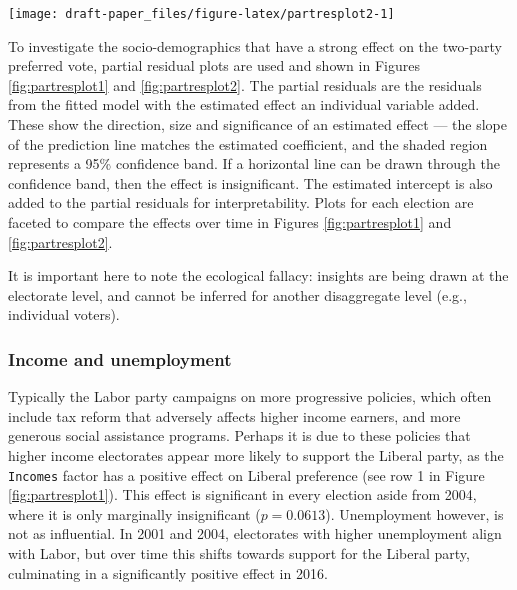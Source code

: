 \documentclass[11pt,a4paper,]{article}
\let\origfigure\figure
\let\endorigfigure\endfigure
\renewenvironment{figure}[1][2] {
    \expandafter\origfigure\expandafter[htbp]
} {
    \endorigfigure
}
\begin{document}
\begin{figure}[h]

{\centering \texttt{[image: draft-paper\_files/figure-latex/partresplot2-1]} 

}

\caption{Partial residual plots by election year for a selection of predictors. Linear model with 95\% confidence bands is overlaid. Several predictors have a negative relationship: with larger values indicating the electorate more likely preferences Labor. Education exhibits a strong temporal change.}\label{fig:partresplot2}
\end{figure}

To investigate the socio-demographics that have a strong effect on the two-party preferred vote, partial residual plots are used and shown in Figures \ref{fig:partresplot1} and \ref{fig:partresplot2}. The partial residuals are the residuals from the fitted model with the estimated effect an individual variable added. These show the direction, size and significance of an estimated effect --- the slope of the prediction line matches the estimated coefficient, and the shaded region represents a 95\% confidence band. If a horizontal line can be drawn through the confidence band, then the effect is insignificant. The estimated intercept is also added to the partial residuals for interpretability. Plots for each election are faceted to compare the effects over time in Figures \ref{fig:partresplot1} and \ref{fig:partresplot2}.

It is important here to note the ecological fallacy: insights are being drawn at the electorate level, and cannot be inferred for another disaggregate level (e.g., individual voters).

\hypertarget{income-and-unemployment}{%
\subsubsection{Income and unemployment}\label{income-and-unemployment}}

Typically the Labor party campaigns on more progressive policies, which often include tax reform that adversely affects higher income earners, and more generous social assistance programs. Perhaps it is due to these policies that higher income electorates appear more likely to support the Liberal party, as the \texttt{Incomes} factor has a positive effect on Liberal preference (see row 1 in Figure \ref{fig:partresplot1}). This effect is significant in every election aside from 2004, where it is only marginally insignificant (\(p = 0.0613\)). Unemployment however, is not as influential. In 2001 and 2004, electorates with higher unemployment align with Labor, but over time this shifts towards support for the Liberal party, culminating in a significantly positive effect in 2016.
\end{document}
